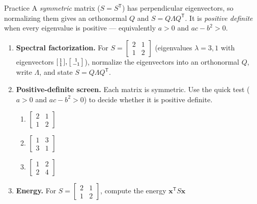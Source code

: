 \documentclass[10pt]{article}
\newcommand{\xx}{\mathbf{x}}
\newcommand{\T}{\mathsf{T}}
\begin{document}
\namedateperiod

\vspace{0.12in}

\begin{notesbox}{Practice}
A \emph{symmetric} matrix ($S=S^{\T}$) has perpendicular eigenvectors, so normalizing them gives an
orthonormal $Q$ and $S=Q\Lambda Q^{\T}$. It is \emph{positive definite} when every eigenvalue is
positive --- equivalently $a>0$ and $ac-b^2>0$.

\begin{enumerate}[leftmargin=1.9em, itemsep=12pt]
  \item \textbf{Spectral factorization.} For $S=\begin{bmatrix} 2 & 1 \\ 1 & 2 \end{bmatrix}$ (eigenvalues
        $\lambda=3,1$ with eigenvectors $\begin{bsmallmatrix}1\\1\end{bsmallmatrix},\begin{bsmallmatrix}1\\-1\end{bsmallmatrix}$),
        normalize the eigenvectors into an orthonormal $Q$, write $\Lambda$, and state $S=Q\Lambda Q^{\T}$. 
  \item \textbf{Positive-definite screen.} Each matrix is symmetric. Use the quick test ($a>0$ and $ac-b^2>0$)
        to decide whether it is positive definite.
    \begin{enumerate}[label=(\alph*), leftmargin=1.8em, itemsep=4pt]
      \item $\begin{bmatrix} 2 & 1 \\ 1 & 2 \end{bmatrix}$ \hfill
      \item $\begin{bmatrix} 1 & 3 \\ 3 & 1 \end{bmatrix}$ \hfill
      \item $\begin{bmatrix} 1 & 2 \\ 2 & 4 \end{bmatrix}$
    \end{enumerate}
    \vspace{1.3cm}
  \item \textbf{Energy.} For $S=\begin{bmatrix} 2 & 1 \\ 1 & 2 \end{bmatrix}$, compute the energy $\xx^{\T}S\xx$

\end{enumerate}
\end{notesbox}
\end{document}
